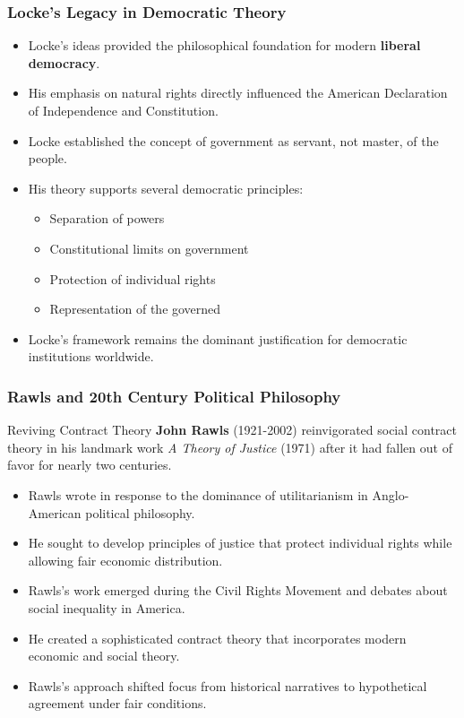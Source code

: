\documentclass[aspectratio=169]{beamer}
\begin{document}
\begin{frame}
  \frametitle{Locke's Legacy in Democratic Theory}
  
  \begin{itemize}
    \item Locke's ideas provided the philosophical foundation for modern \textbf{liberal democracy}.
    \item His emphasis on natural rights directly influenced the American Declaration of Independence and Constitution.
    \item Locke established the concept of government as servant, not master, of the people.
    \item His theory supports several democratic principles:
      \begin{itemize}
        \item Separation of powers
        \item Constitutional limits on government
        \item Protection of individual rights
        \item Representation of the governed
      \end{itemize}
    \item Locke's framework remains the dominant justification for democratic institutions worldwide.
  \end{itemize}
\end{frame}

\begin{frame}
  \frametitle{Rawls and 20th Century Political Philosophy}
  
  \begin{block}{Reviving Contract Theory}
    \textbf{John Rawls} (1921-2002) reinvigorated social contract theory in his landmark work \textit{A Theory of Justice} (1971) after it had fallen out of favor for nearly two centuries.
  \end{block}
  
  \begin{itemize}
    \item Rawls wrote in response to the dominance of utilitarianism in Anglo-American political philosophy.
    \item He sought to develop principles of justice that protect individual rights while allowing fair economic distribution.
    \item Rawls's work emerged during the Civil Rights Movement and debates about social inequality in America.
    \item He created a sophisticated contract theory that incorporates modern economic and social theory.
    \item Rawls's approach shifted focus from historical narratives to hypothetical agreement under fair conditions.
  \end{itemize}
\end{frame}
\end{document}
